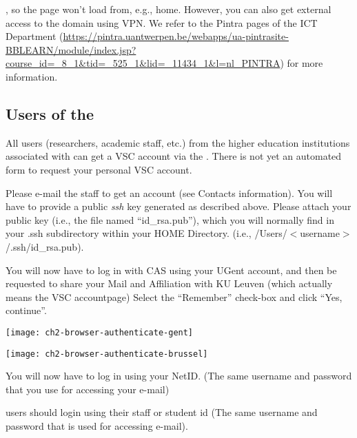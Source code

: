 , so the page won't load from, e.g., home. However, you can also get
external access to the \university domain using VPN. We refer to the Pintra
pages of the ICT Department
(\url{https://pintra.uantwerpen.be/webapps/ua-pintrasite-BBLEARN/module/index.jsp?course_id=_8_1&tid=_525_1&lid=_11434_1&l=nl_PINTRA})
for more information.

\subsection{Users of the \association}
\label{sec:users-of-association}

All users (researchers, academic staff, etc.) from the higher education
institutions associated with \university can get a VSC account via the \university. There is not
yet an automated form to request your personal VSC account.

Please e-mail the \hpc staff to get an account (see Contacts information).
You will have to provide a public \emph{ssh} key generated as described
above. Please attach your public key (i.e., the file named ``id\_rsa.pub''),
which you will normally find in your .ssh subdirectory within your HOME
Directory. (i.e., /Users/$<$username$>$/.ssh/id\_rsa.pub).


\fi %

\ifgent
  You will now have to log in with CAS using your UGent account, and then be requested
  to share your Mail and Affiliation with KU Leuven (which actually means the VSC accountpage)
  Select the ``Remember'' check-box and click ``Yes, continue''.
  \begin{center}
  \texttt{[image: ch2-browser-authenticate-gent]}
  \end{center}
\fi

\ifbrussel
  \begin{center}
  \texttt{[image: ch2-browser-authenticate-brussel]}
  \end{center}

  You will now have to log in using your NetID. (The same username and password that you use for accessing your e-mail)

\fi

\ifleuven
\hpc users should login using their staff or student id 
(The same username and password that is used for accessing e-mail).
 
